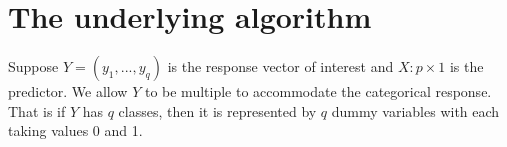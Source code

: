 \documentclass[nojss]{jss}
\numberwithin{equation}{section}
\begin{document}



\section{The underlying algorithm} \label{sec:models}

Suppose $ Y = (y_1, ..., y_q) $ is the response vector of interest and $ X: p \times 1 $ is the predictor.  We allow $ Y$ to be multiple to accommodate the categorical response. That is if $ Y$ has $q$ classes, then it is represented by $ q $ dummy variables with each taking values 0 and 1.
\end{document}
